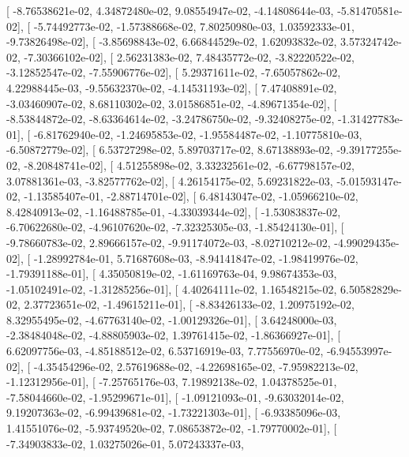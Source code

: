 \documentclass{article}
\begin{document}
       [ -8.76538621e-02,   4.34872480e-02,   9.08554947e-02,
         -4.14808644e-03,  -5.81470581e-02],
       [ -5.74492773e-02,  -1.57388668e-02,   7.80250980e-03,
          1.03592333e-01,  -9.73826498e-02],
       [ -3.85698843e-02,   6.66844529e-02,   1.62093832e-02,
          3.57324742e-02,  -7.30366102e-02],
       [  2.56231383e-02,   7.48435772e-02,  -3.82220522e-02,
         -3.12852547e-02,  -7.55906776e-02],
       [  5.29371611e-02,  -7.65057862e-02,   4.22988445e-03,
         -9.55632370e-02,  -4.14531193e-02],
       [  7.47408891e-02,  -3.03460907e-02,   8.68110302e-02,
          3.01586851e-02,  -4.89671354e-02],
       [ -8.53844872e-02,  -8.63364614e-02,  -3.24786750e-02,
         -9.32408275e-02,  -1.31427783e-01],
       [ -6.81762940e-02,  -1.24695853e-02,  -1.95584487e-02,
         -1.10775810e-03,  -6.50872779e-02],
       [  6.53727298e-02,   5.89703717e-02,   8.67138893e-02,
         -9.39177255e-02,  -8.20848741e-02],
       [  4.51255898e-02,   3.33232561e-02,  -6.67798157e-02,
          3.07881361e-03,  -3.82577762e-02],
       [  4.26154175e-02,   5.69231822e-03,  -5.01593147e-02,
         -1.13585407e-01,  -2.88714701e-02],
       [  6.48143047e-02,  -1.05966210e-02,   8.42840913e-02,
         -1.16488785e-01,  -4.33039344e-02],
       [ -1.53083837e-02,  -6.70622680e-02,  -4.96107620e-02,
         -7.32325305e-03,  -1.85424130e-01],
       [ -9.78660783e-02,   2.89666157e-02,  -9.91174072e-03,
         -8.02710212e-02,  -4.99029435e-02],
       [ -1.28992784e-01,   5.71687608e-03,  -8.94141847e-02,
         -1.98419976e-02,  -1.79391188e-01],
       [  4.35050819e-02,  -1.61169763e-04,   9.98674353e-03,
         -1.05102491e-02,  -1.31285256e-01],
       [  4.40264111e-02,   1.16548215e-02,   6.50582829e-02,
          2.37723651e-02,  -1.49615211e-01],
       [ -8.83426133e-02,   1.20975192e-02,   8.32955495e-02,
         -4.67763140e-02,  -1.00129326e-01],
       [  3.64248000e-03,  -2.38484048e-02,  -4.88805903e-02,
          1.39761415e-02,  -1.86366927e-01],
       [  6.62097756e-03,  -4.85188512e-02,   6.53716919e-03,
          7.77556970e-02,  -6.94553997e-02],
       [ -4.35454296e-02,   2.57619688e-02,  -4.22698165e-02,
         -7.95982213e-02,  -1.12312956e-01],
       [ -7.25765176e-03,   7.19892138e-02,   1.04378525e-01,
         -7.58044660e-02,  -1.95299671e-01],
       [ -1.09121093e-01,  -9.63032014e-02,   9.19207363e-02,
         -6.99439681e-02,  -1.73221303e-01],
       [ -6.93385096e-03,   1.41551076e-02,  -5.93749520e-02,
          7.08653872e-02,  -1.79770002e-01],
       [ -7.34903833e-02,   1.03275026e-01,   5.07243337e-03,
\end{document}

